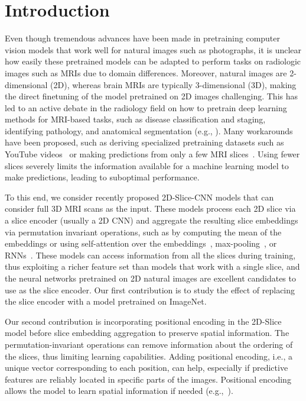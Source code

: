 \section{Introduction}\label{sec:intro}

Even though tremendous advances have been made in pretraining computer vision models that work well for natural images such as photographs, it is unclear how easily these pretrained models can be adapted to perform tasks on radiologic images such as MRIs due to domain differences. Moreover, natural images are 2-dimensional (2D), whereas brain MRIs are typically 3-dimensional (3D), making the direct finetuning of the model pretrained on 2D images challenging.
This has led to an active debate in the radiology field on how to pretrain deep learning methods for MRI-based tasks, such as disease classification and staging, identifying pathology, and anatomical  segmentation (e.g., \cite{alzubaidi2021deepening,ke2021chextransfer,valverde2021transfer}).
Many workarounds have been proposed, such as  deriving specialized pretraining datasets such as  YouTube videos~\cite{MALIK2022325} or making predictions from only a few MRI slices~\cite{hon2017towards,valliani2017deep,islam2018brain,MRISignBrainAge}. Using fewer slices severely limits the information available for a machine learning model to make predictions, leading to suboptimal performance.








To this end, we consider recently proposed 2D-Slice-CNN models that can consider full 3D MRI scans as the input. These models process each 2D slice via a slice encoder (usually a 2D CNN) and aggregate the resulting slice embeddings via permutation invariant operations, such as by computing the mean of the embeddings or using self-attention over the embeddings~\cite{gupta2021improved},  max-pooling~\cite{dhinagar2022evaluation}, or RNNs~\cite{lam2020accurate}.
These models can access information from all the slices during training, thus exploiting a richer feature set than models that work with a single slice, and the neural networks pretrained on 2D natural images are excellent candidates to use as the slice encoder. Our first contribution is to study the effect of replacing the slice encoder with a model pretrained on ImageNet.

Our second contribution is incorporating positional encoding in the 2D-Slice model before slice embedding aggregation to preserve spatial information.
The permutation-invariant operations can remove information about the ordering of the slices, thus limiting learning capabilities. Adding positional encoding, i.e., a unique vector corresponding to each position, can help, especially if predictive features are reliably located in specific parts of the images. Positional encoding allows the model to learn spatial information if needed (e.g.,~\cite{SCHLEMPER2019197}).









